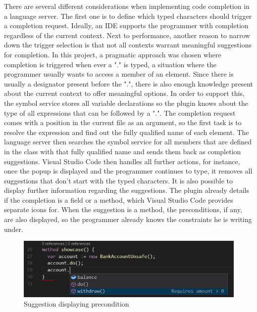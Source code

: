  There are several different considerations when implementing code completion in a language server. The first one is to define which typed characters should trigger a completion request. Ideally, an IDE supports the programmer with completion regardless of the current context. Next to performance, another reason to narrow down the trigger selection is that not all contexts warrant meaningful suggestions for completion. In this project, a pragmatic approach was chosen where completion is triggered when ever a "." is typed, a situation where the programmer usually wants to access a member of an element. Since there is usually a designator present before the ".", there is also enough knowledge present about the current context to offer meaningful options. \newline
 In order to support this, the symbol service stores all variable declarations so the plugin knows about the type of all expressions that can be followed by a ".". The completion request comes with a position in the current file as an argument, so the first task is to resolve the expression and find out the fully qualified name of each element. The language server then searches the symbol service for all members that are defined in the class with that fully qualified name and sends them back as completion suggestions. \newline
 Visual Studio Code then handles all further actions, for instance, once the popup is displayed and the programmer continues to type, it removes all suggestions that don't start with the typed characters. It is also possible to display further information regarding the suggestions. The plugin already details if the completion is a field or a method, which Visual Studio Code provides  separate icons for. When the suggestion is a method, the preconditions, if any, are also displayed, so the programmer already knows the constraints he is writing under. \newline
 
 \begin{figure}[H]
	\centering
	\includegraphics[width=1\textwidth]{img/codeCompletionMethod}
	\caption{Suggestion displaying precondition}
	\label{fig:codecompletionmethod}
\end{figure}

